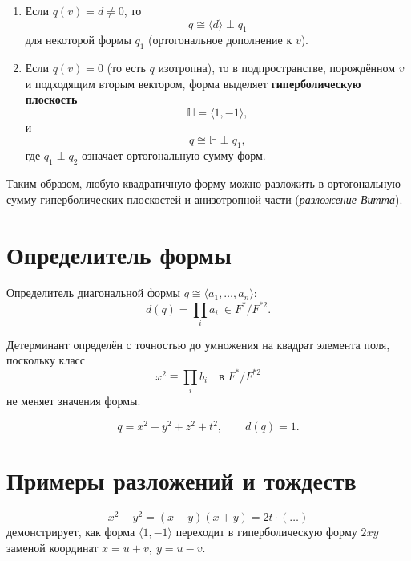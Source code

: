\documentclass[12pt]{article}
\begin{document}
    \begin{enumerate}
        \item Если $q(v) = d \neq 0$, то
        \[
        q \cong \langle d \rangle \perp q_1
        \]
        для некоторой формы $q_1$ (ортогональное дополнение к $v$).
        
        \item Если $q(v) = 0$ (то есть $q$ изотропна), то в подпространстве, порождённом $v$ и подходящим вторым вектором, форма выделяет \textbf{гиперболическую плоскость}
        \[
        \mathbb{H} = \langle 1, -1 \rangle,
        \]
        и
        \[
        q \cong \mathbb{H} \perp q_1,
        \]
        где $q_1 \perp q_2$ означает ортогональную сумму форм.
    \end{enumerate}
    
    Таким образом, любую квадратичную форму можно разложить в ортогональную сумму гиперболических плоскостей и анизотропной части (\emph{разложение Витта}).
    
    \section{Определитель формы}
    
    \begin{definition}[Определитель]
        Определитель диагональной формы $q \cong \langle a_1, \dots, a_n \rangle$:
        \[
        d(q) = \prod_i a_i \ \in F^*/F^{*2}.
        \]
    \end{definition}
    
    Детерминант определён с точностью до умножения на квадрат элемента поля, поскольку класс
    \[
    x^2 \equiv \prod_i b_i \quad \text{в } F^*/F^{*2}
    \]
    не меняет значения формы.
    
    \begin{example}
        \[
        q = x^2 + y^2 + z^2 + t^2, \qquad d(q) = 1.
        \]
    \end{example}
    
    \section{Примеры разложений и тождеств}
    
    \begin{example}
        \[
        x^2 - y^2 = (x - y)(x + y) = 2t \cdot (\dots)
        \]
        демонстрирует, как форма $\langle 1, -1 \rangle$ переходит в гиперболическую форму $2xy$ заменой координат $x = u + v, \ y = u - v$.
    \end{example}
    
\end{document}
